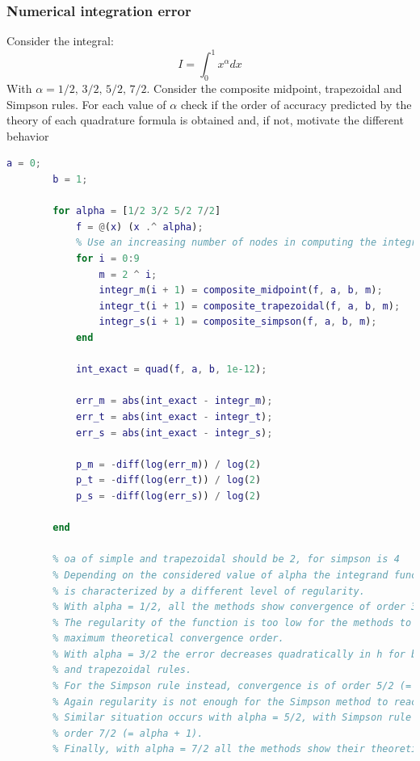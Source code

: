     \subsubsection{Numerical integration error}
        Consider the integral:
        $$
        I=\int_0^1x^\alpha dx
        $$
        With $\alpha=1/2,\,3/2,\,5/2,\,7/2$. Consider the composite midpoint, trapezoidal and Simpson rules. For each value of $\alpha$ check if the order of accuracy predicted by the theory of each quadrature formula is obtained and, if not, motivate the different behavior
        \begin{lstlisting}[language=Matlab, escapeinside=`', gobble=8]
        a = 0;
        b = 1;
        
        for alpha = [1/2 3/2 5/2 7/2]
            f = @(x) (x .^ alpha);
            % Use an increasing number of nodes in computing the integral
            for i = 0:9
                m = 2 ^ i;
                integr_m(i + 1) = composite_midpoint(f, a, b, m);
                integr_t(i + 1) = composite_trapezoidal(f, a, b, m);
                integr_s(i + 1) = composite_simpson(f, a, b, m);
            end
        
            int_exact = quad(f, a, b, 1e-12);
        
            err_m = abs(int_exact - integr_m);
            err_t = abs(int_exact - integr_t);
            err_s = abs(int_exact - integr_s);
        
            p_m = -diff(log(err_m)) / log(2)
            p_t = -diff(log(err_t)) / log(2)
            p_s = -diff(log(err_s)) / log(2)
        
        end

        % oa of simple and trapezoidal should be 2, for simpson is 4
        % Depending on the considered value of alpha the integrand function
        % is characterized by a different level of regularity.
        % With alpha = 1/2, all the methods show convergence of order 3/2 (= alpha + 1)
        % The regularity of the function is too low for the methods to reach their
        % maximum theoretical convergence order.
        % With alpha = 3/2 the error decreases quadratically in h for both midpoint
        % and trapezoidal rules.
        % For the Simpson rule instead, convergence is of order 5/2 (= alpha + 1).
        % Again regularity is not enough for the Simpson method to reach fourth order.
        % Similar situation occurs with alpha = 5/2, with Simpson rule showing 
        % order 7/2 (= alpha + 1).
        % Finally, with alpha = 7/2 all the methods show their theoretical orders.
        \end{lstlisting}


